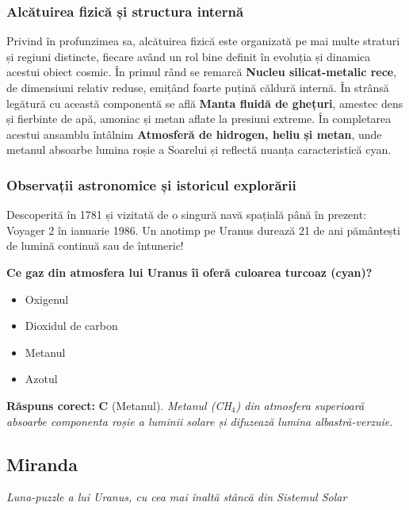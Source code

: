 \subsubsection*{Alcătuirea fizică și structura internă}
Privind în profunzimea sa, alcătuirea fizică este organizată pe mai multe straturi și regiuni distincte, fiecare având un rol bine definit în evoluția și dinamica acestui obiect cosmic. În primul rând se remarcă \textbf{Nucleu silicat-metalic rece}, de dimensiuni relativ reduse, emițând foarte puțină căldură internă. În strânsă legătură cu această componentă se află \textbf{Manta fluidă de \guillemotleft{}ghețuri\guillemotright{}}, amestec dens și fierbinte de apă, amoniac și metan aflate la presiuni extreme. În completarea acestui ansamblu întâlnim \textbf{Atmosferă de hidrogen, heliu și metan}, unde metanul absoarbe lumina roșie a Soarelui și reflectă nuanța caracteristică cyan.

\subsubsection*{Observații astronomice și istoricul explorării}
Descoperită în 1781 și vizitată de o singură navă spațială până în prezent: Voyager 2 în ianuarie 1986. Un anotimp pe Uranus durează 21 de ani pământești de lumină continuă sau de întuneric!

\vspace{6pt}
\begin{tcolorbox}[orbitarquiz, title={\textbf{Întrebare de verificare \#24: Uranus}}]
\textbf{Ce gaz din atmosfera lui Uranus îi oferă culoarea turcoaz (cyan)?}
\begin{itemize}[leftmargin=2.2em, itemsep=2pt, topsep=4pt]
  \item[$\square$ \textbf{A.}] Oxigenul
  \item[$\square$ \textbf{B.}] Dioxidul de carbon
  \item[$\square$ \textbf{C.}] Metanul
  \item[$\square$ \textbf{D.}] Azotul
\end{itemize}
\vspace{2pt}
{\footnotesize\color{orbitarMuted}\textbf{Răspuns corect:} \textbf{C} (Metanul). \emph{Metanul (CH$_4$) din atmosfera superioară absoarbe componenta roșie a luminii solare și difuzează lumina albastră-verzuie.}}
\end{tcolorbox}
\clearpage


\subsection{Miranda}
\label{sec:body-miranda}
\vspace{-4pt}
{\large\itshape\color{orbitarAccent} Luna-puzzle a lui Uranus, cu cea mai înaltă stâncă din Sistemul Solar}\\[4pt]



